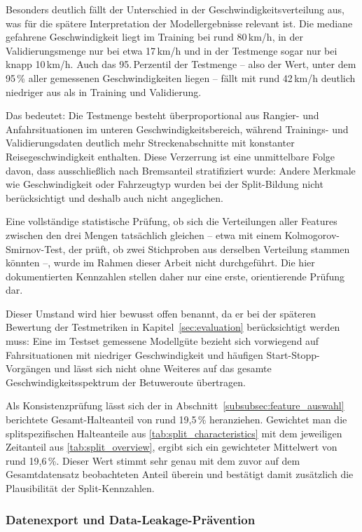 Besonders deutlich fällt der Unterschied in der Geschwindigkeitsverteilung aus, was für die spätere Interpretation der Modellergebnisse relevant ist. Die mediane gefahrene Geschwindigkeit liegt im Training bei rund 80\,km/h, in der Validierungsmenge nur bei etwa 17\,km/h und in der Testmenge sogar nur bei knapp 10\,km/h. Auch das 95.\,Perzentil der Testmenge -- also der Wert, unter dem 95\,\% aller gemessenen Geschwindigkeiten liegen -- fällt mit rund 42\,km/h deutlich niedriger aus als in Training und Validierung.

Das bedeutet: Die Testmenge besteht überproportional aus Rangier- und Anfahrsituationen im unteren Geschwindigkeitsbereich, während Trainings- und Validierungsdaten deutlich mehr Streckenabschnitte mit konstanter Reisegeschwindigkeit enthalten. Diese Verzerrung ist eine unmittelbare Folge davon, dass ausschließlich nach Bremsanteil stratifiziert wurde: Andere Merkmale wie Geschwindigkeit oder Fahrzeugtyp wurden bei der Split-Bildung nicht berücksichtigt und deshalb auch nicht angeglichen.

Eine vollständige statistische Prüfung, ob sich die Verteilungen aller Features zwischen den drei Mengen tatsächlich gleichen -- etwa mit einem Kolmogorov-Smirnov-Test, der prüft, ob zwei Stichproben aus derselben Verteilung stammen könnten --, wurde im Rahmen dieser Arbeit nicht durchgeführt. Die hier dokumentierten Kennzahlen stellen daher nur eine erste, orientierende Prüfung dar.

Dieser Umstand wird hier bewusst offen benannt, da er bei der späteren Bewertung der Testmetriken in Kapitel~\ref{sec:evaluation} berücksichtigt werden muss: Eine im Testset gemessene Modellgüte bezieht sich vorwiegend auf Fahrsituationen mit niedriger Geschwindigkeit und häufigen Start-Stopp-Vorgängen und lässt sich nicht ohne Weiteres auf das gesamte Geschwindigkeitsspektrum der Betuweroute übertragen.

Als Konsistenzprüfung lässt sich der in Abschnitt~\ref{subsubsec:feature_auswahl} berichtete Gesamt-Halteanteil von rund 19,5\,\% heranziehen. Gewichtet man die splitspezifischen Halteanteile aus \autoref{tab:split_characteristics} mit dem jeweiligen Zeitanteil aus \autoref{tab:split_overview}, ergibt sich ein gewichteter Mittelwert von rund 19,6\,\%. Dieser Wert stimmt sehr genau mit dem zuvor auf dem Gesamtdatensatz beobachteten Anteil überein und bestätigt damit zusätzlich die Plausibilität der Split-Kennzahlen.

\subsubsection{Datenexport und Data-Leakage-Prävention}

